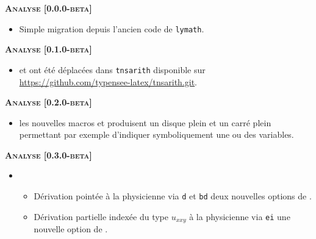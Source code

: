 \documentclass[12pt,a4paper]{book}
\begin{document}
\begin{description}


\begin{center}
    \textbf{\textsc{Analyse [0.0.0-beta]}}
\end{center}

\begin{itemize}[itemsep=.5em]
    \item Simple migration depuis l'ancien code de \verb+lymath+.
\end{itemize}


\begin{center}
    \textbf{\textsc{Analyse [0.1.0-beta]}}
\end{center}

\begin{itemize}[itemsep=.5em]
    \item {}  et  ont été déplacées dans \texttt{tnsarith} disponible sur \url{https://github.com/typensee-latex/tnsarith.git}.
\end{itemize}


\begin{center}
    \textbf{\textsc{Analyse [0.2.0-beta]}}
\end{center}

\begin{itemize}[itemsep=.5em]
    \item {} les nouvelles macros  et  produisent un disque plein et un carré plein permettant par exemple d'indiquer symboliquement une ou des variables.
    
    
\end{itemize}


\begin{center}
    \textbf{\textsc{Analyse [0.3.0-beta]}}
\end{center}

\begin{itemize}[itemsep=.5em]
    \item {}
    \begin{itemize}[itemsep=.5em]
        \item Dérivation pointée à la physicienne via \verb+d+ et \verb+bd+ deux nouvelles options de .

        \item Dérivation partielle indexée du type $u_{xxy}$ à la physicienne via \verb+ei+ une nouvelle option de .
    \end{itemize}


\end{itemize}
\end{description}
\end{document}
